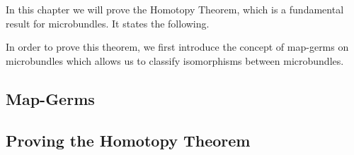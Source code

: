 \begin{myparagraph}
    In this chapter we will prove the Homotopy Theorem,
    which is a fundamental result for microbundles.
    It states the following.
\end{myparagraph}

\begin{myparagraph}
    In order to prove this theorem,
    we first introduce the concept of map-germs
    on microbundles which allows us to classify
    isomorphisms between microbundles.
\end{myparagraph}
\subsection{Map-Germs}\label{section::germs}




\subsection{Proving the Homotopy Theorem}\label{section::homotopy_prove}





